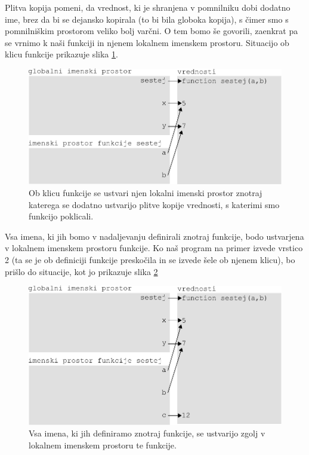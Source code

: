 Plitva kopija pomeni, da vrednost, ki je shranjena v pomnilniku dobi dodatno ime, brez da bi se dejansko kopirala (to bi bila globoka kopija), s čimer smo s pomnilniškim prostorom veliko bolj varčni. O tem bomo še govorili, zaenkrat pa se vrnimo k naši funkciji in njenem lokalnem imenskem prostoru. Situacijo ob klicu funkcije prikazuje slika \ref{img:imenski_prostor_3}.
\begin{figure}
    \centering
    \includegraphics[width=\linewidth]{img/imenski_prostor_3.pdf}
    \caption{Ob klicu funkcije se ustvari njen lokalni imenski prostor znotraj katerega se dodatno ustvarijo plitve kopije vrednosti, s katerimi smo funkcijo poklicali.}
    \label{img:imenski_prostor_3}
\end{figure}

Vsa imena, ki jih bomo v nadaljevanju definirali znotraj funkcije, bodo ustvarjena v lokalnem imenskem prostoru funkcije. Ko naš program na primer izvede vrstico 2 (ta se je ob definiciji funkcije preskočila in se izvede šele ob njenem klicu), bo prišlo do situacije, kot jo prikazuje slika \ref{img:imenski_prostor_4}
\begin{figure}
    \centering
    \includegraphics[width=\linewidth]{img/imenski_prostor_4.pdf}
    \caption{Vsa imena, ki jih definiramo znotraj funkcije, se ustvarijo zgolj v lokalnem imenskem prostoru te funkcije.}
    \label{img:imenski_prostor_4}
\end{figure}

